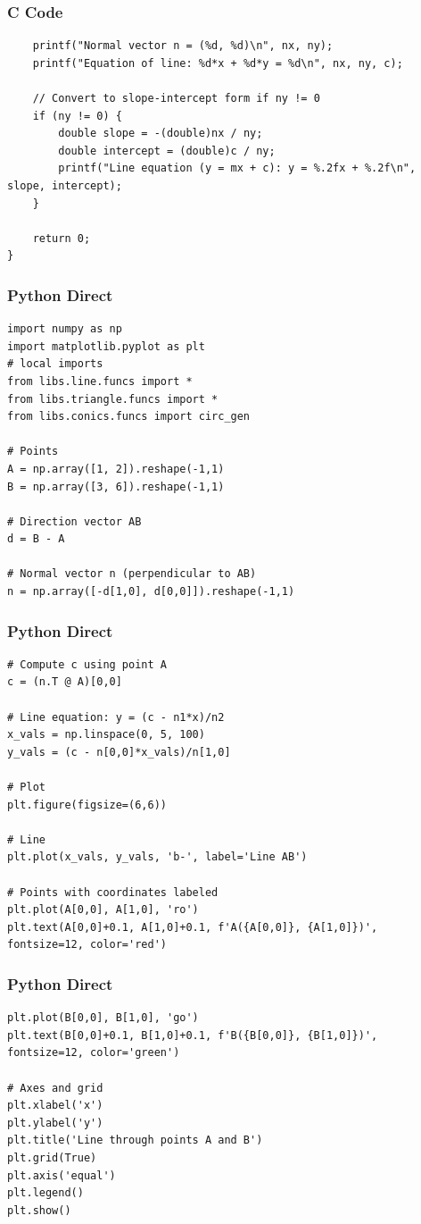 \documentclass{beamer}
\begin{document}
\begin{frame}[fragile]
    \frametitle{C Code}
    \begin{lstlisting}
    printf("Normal vector n = (%d, %d)\n", nx, ny);
    printf("Equation of line: %d*x + %d*y = %d\n", nx, ny, c);

    // Convert to slope-intercept form if ny != 0
    if (ny != 0) {
        double slope = -(double)nx / ny;
        double intercept = (double)c / ny;
        printf("Line equation (y = mx + c): y = %.2fx + %.2f\n", slope, intercept);
    }

    return 0;
}
    \end{lstlisting}
\end{frame}
\begin{frame}[fragile]
    \frametitle{Python Direct}
    \begin{lstlisting}
import numpy as np
import matplotlib.pyplot as plt
# local imports
from libs.line.funcs import *
from libs.triangle.funcs import *
from libs.conics.funcs import circ_gen

# Points
A = np.array([1, 2]).reshape(-1,1)
B = np.array([3, 6]).reshape(-1,1)

# Direction vector AB
d = B - A

# Normal vector n (perpendicular to AB)
n = np.array([-d[1,0], d[0,0]]).reshape(-1,1)
 \end{lstlisting}
\end{frame}
\begin{frame}[fragile]
    \frametitle{Python Direct}
    \begin{lstlisting}
# Compute c using point A
c = (n.T @ A)[0,0]

# Line equation: y = (c - n1*x)/n2
x_vals = np.linspace(0, 5, 100)
y_vals = (c - n[0,0]*x_vals)/n[1,0]

# Plot
plt.figure(figsize=(6,6))

# Line
plt.plot(x_vals, y_vals, 'b-', label='Line AB')

# Points with coordinates labeled
plt.plot(A[0,0], A[1,0], 'ro')  
plt.text(A[0,0]+0.1, A[1,0]+0.1, f'A({A[0,0]}, {A[1,0]})', fontsize=12, color='red')
 \end{lstlisting}
\end{frame}
\begin{frame}[fragile]
    \frametitle{Python Direct}
    \begin{lstlisting}
plt.plot(B[0,0], B[1,0], 'go')  
plt.text(B[0,0]+0.1, B[1,0]+0.1, f'B({B[0,0]}, {B[1,0]})', fontsize=12, color='green')

# Axes and grid
plt.xlabel('x')
plt.ylabel('y')
plt.title('Line through points A and B')
plt.grid(True)
plt.axis('equal')
plt.legend()
plt.show()
    \end{lstlisting}
\end{frame}
\end{document}
